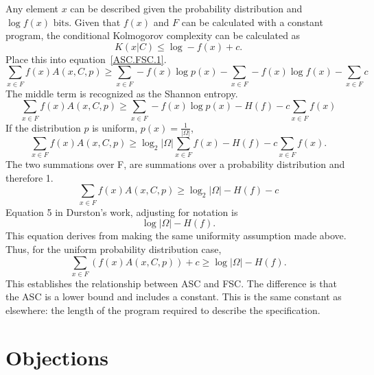 Any element $x$ can be described given the probability distribution and $\log f(x) \mbox{ bits}$.
Given that $f(x)$ and $F$ can be calculated with a constant program, the conditional Kolmogorov complexity can be calculated as
\begin{equation}
    K(x|C) \leq \log -f(x) + c  \mbox{.}
\end{equation}
Place this into equation~\ref{ASC.FSC.1}.
\begin{equation}
    \sum_{x \in F} f(x) A(x,C,p) 
    \geq \sum_{x \in F} -f(x)\log p(x) - \sum_{x \in F} - f(x) \log f(x) - \sum_{x \in F} c
\end{equation}
The middle term is recognized as the Shannon entropy.
\begin{equation}
    \sum_{x \in F} f(x) A(x,C,p) 
    \geq \sum_{x \in F} -f(x) \log p(x) - H(f) - c \sum_{x \in F} f(x)
\end{equation}
If the distribution $p$ is uniform, $p(x) = \frac{1}{|\Omega|}$,
\begin{equation}
    \sum_{x \in F} f(x) A(x,C,p) 
    \geq \log_2 |\Omega| \sum_{x \in F} f(x) - H(f) - c \sum_{x \in F} f(x)  \mbox{.}
\end{equation}
The two summations over F, are summations over a probability distribution and therefore 1.
\begin{equation}
    \sum_{x \in F} f(x) A(x,C,p) 
    \geq \log_2 |\Omega| - H(f) - c 
\end{equation}
Equation 5 in Durston's work, adjusting for notation is
\begin{equation}
    \log |\Omega| - H(f)  \mbox{.}
\end{equation}
This equation derives from making the same uniformity assumption made above.
Thus, for the uniform probability distribution case,
\begin{equation}
    \sum_{x \in F} (f(x) A(x,C,p) ) + c
    \geq \log |\Omega| - H(f)  \mbox{.}
\end{equation}
This establishes the relationship between ASC and FSC.
The difference is that the ASC is a lower bound and includes a constant.
This is the same constant as elsewhere: the length of the program required to describe the specification.

\section{Objections}

